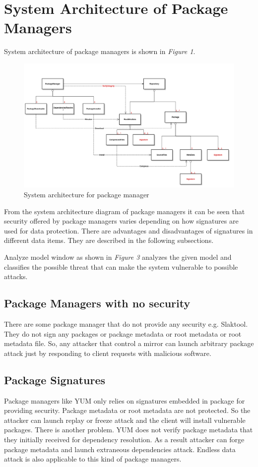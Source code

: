 \documentclass{IEEEtran}
\begin{document}
\section{System Architecture of Package Managers}
\label{sec:sys-architecture}
System architecture of package managers is shown in \emph{Figure 1}. 

\begin{figure}[!t]
	\includegraphics[width=\textwidth]{figures/package_manager_archi}
	\caption[Block diagram for motivation example system]{\label{f:sysarchtect}System architecture for package manager}
\end{figure}

From the system architecture diagram of package managers it can be seen that security offered by package managers varies depending on how signatures are used for data protection. There are advantages and disadvantages of signatures in different data items. They are described in the following subsections.

Analyze model window as shown in \emph{Figure 3} analyzes the given model and classifies the possible threat that can make the system vulnerable to possible attacks.


\subsection{Package Managers with no security}
\label{subsec:pcage-man-no-sec}
There are some package manager that do not provide any security e.g. Slaktool. They do not sign any packages or package metadata or root metadata or root metadata file. So, any attacker that control a mirror can launch arbitrary package attack just by responding to client requests with malicious software.

\subsection{Package Signatures}
\label{subsec:pkg-sign}
Package managers like YUM only relies on signatures embedded in package for providing security. Package metadata or root metadata are not protected. So the attacker can launch replay or freeze attack and the client will install vulnerable packages. There is another problem.  YUM does not verify package metadata that they initially received for dependency resolution. As a result attacker can forge package metadata and launch extraneous dependencies attack. Endless data attack is also applicable to this kind of package managers.
\end{document}

